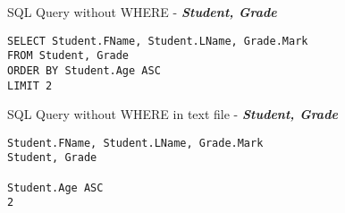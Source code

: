 \documentclass[11pt]{article}
\begin{document}
\noindent
SQL Query without WHERE - \textbf{\emph{Student, Grade}}
\begin{center}
	\begin{verbatim}
SELECT Student.FName, Student.LName, Grade.Mark
FROM Student, Grade
ORDER BY Student.Age ASC
LIMIT 2 
	\end{verbatim}
\end{center}

\noindent
SQL Query without WHERE in text file - \textbf{\emph{Student, Grade}}
\begin{center}
	\begin{verbatim}
Student.FName, Student.LName, Grade.Mark
Student, Grade

Student.Age ASC
2 
	\end{verbatim}
\end{center}
\end{document}
